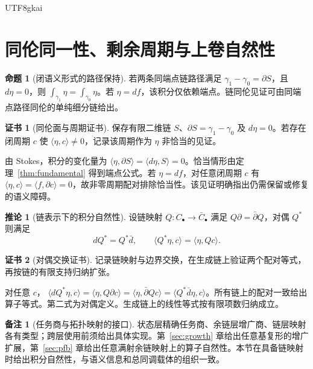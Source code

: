 \documentclass[12pt]{report}
\makeatletter
\theoremstyle{definition}
\newtheorem{proposition}{命题}[chapter]
\newtheorem{corollary}{推论}[chapter]
\newtheorem{remark}{备注}[chapter]
\newtheorem{Certificate}{证书}[chapter]
\renewenvironment{proof}[1][\proofname]{\par
  \pushQED{\qed}\normalfont
  \topsep6\p@\@plus6\p@\relax
  \trivlist
  \item[\hskip\labelsep\normalfont #1\@addpunct{.}]\ignorespaces
}{
  \popQED\endtrivlist\@endpefalse
}
\makeatother
\begin{document}
\begin{CJK*}{UTF8}{gkai}
\section{同伦同一性、剩余周期与上卷自然性}
\begin{proposition}[闭语义形式的路径保持]
\label{prop:path}
若两条同端点链路径满足 \(\gamma_1-\gamma_0=\partial S\)，且 \(d\eta=0\)，则
\(\int_{\gamma_1}\eta=\int_{\gamma_0}\eta\)。若 \(\eta=df\)，该积分仅依赖端点。链同伦见证可由同端点路径同伦的单纯细分链给出。
\end{proposition}
\begin{Certificate}[同伦面与周期证书]
保存有限二维链 \(S\)、\(\partial S=\gamma_1-\gamma_0\) 及 \(d\eta=0\)。若存在闭周期 \(c\) 使 \(\langle\eta,c\rangle\ne0\)，记录该周期作为 \(\eta\) 非恰当的见证。
\end{Certificate}
\begin{proof}
由 Stokes，积分的变化量为
\(\langle\eta,\partial S\rangle=\langle d\eta,S\rangle=0\)。恰当情形由定理~\ref{thm:fundamental} 得到端点公式。若 \(\eta=df\)，对任意闭周期 \(c\) 有 \(\langle\eta,c\rangle=\langle f,\partial c\rangle=0\)，故非零周期配对排除恰当性。该见证明确指出仍需保留或修复的语义障碍。
\end{proof}

\begin{corollary}[链表示下的积分自然性]
\label{cor:natural}
设链映射 \(Q:C_\bullet\to\bar C_\bullet\) 满足 \(Q\partial=\bar\partial Q\)，对偶 \(Q^*\) 则满足
\[
dQ^*=Q^*\bar d,\qquad
\langle Q^*\eta,c\rangle=\langle\eta,Qc\rangle.
\]
\end{corollary}
\begin{Certificate}[对偶交换证书]
记录链映射与边界交换，在生成链上验证两个配对等式，再按链的有限支持归纳扩张。
\end{Certificate}
\begin{proof}
对任意 \(c\)，
\(\langle dQ^*\eta,c\rangle=\langle\eta,Q\partial c\rangle
=\langle\eta,\bar\partial Qc\rangle=\langle Q^*\bar d\eta,c\rangle\)。所有链上的配对一致给出算子等式。第二式为对偶定义。生成链上的线性等式按有限项数归纳成立。
\end{proof}
\begin{remark}[任务商与拓扑映射的接口]
状态层精确任务商、余链层增广商、链层映射各有类型；跨层使用前须给出具体实现。第~\ref{sec:growth} 章给出任意基复形的增广扩展，第~\ref{sec:pfb} 章给出任意满射余链映射上的算子自然性。本节在具备链映射时给出积分自然性，与语义信息和总同调载体的组织一致\cite{fos,total}。
\end{remark}


\end{CJK*}
\end{document}
